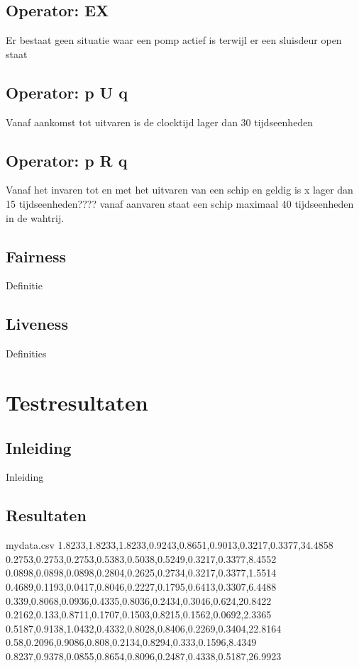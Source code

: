\documentclass{article}
\begin{document}
	\subsection{Operator: EX}
	Er bestaat geen situatie waar een pomp actief is terwijl er een sluisdeur open staat
	\subsection{Operator: p U q}
	Vanaf aankomst tot uitvaren is de clocktijd lager dan 30 tijdseenheden 
	\subsection{Operator: p R q}
	Vanaf het invaren tot en met het uitvaren van een schip en geldig is x lager dan 15 tijdseenheden????
	vanaf aanvaren staat een schip maximaal 40 tijdseenheden in de wahtrij.
	\subsection{Fairness}
	
	Definitie
	
	\subsection{Liveness}
	
	
	Definities
	
	\newpage
	\section{Testresultaten}
	
	\subsection{Inleiding}
	Inleiding
	
	\subsection{Resultaten}
	 \begin{filecontents*}{mydata.csv}
		1.8233,1.8233,1.8233,0.9243,0.8651,0.9013,0.3217,0.3377,34.4858
		0.2753,0.2753,0.2753,0.5383,0.5038,0.5249,0.3217,0.3377,8.4552
		0.0898,0.0898,0.0898,0.2804,0.2625,0.2734,0.3217,0.3377,1.5514
		0.4689,0.1193,0.0417,0.8046,0.2227,0.1795,0.6413,0.3307,6.4488
		0.339,0.8068,0.0936,0.4335,0.8036,0.2434,0.3046,0.624,20.8422
		0.2162,0.133,0.8711,0.1707,0.1503,0.8215,0.1562,0.0692,2.3365
		0.5187,0.9138,1.0432,0.4332,0.8028,0.8406,0.2269,0.3404,22.8164
		0.58,0.2096,0.9086,0.808,0.2134,0.8294,0.333,0.1596,8.4349
		0.8237,0.9378,0.0855,0.8654,0.8096,0.2487,0.4338,0.5187,26.9923 
	\end{filecontents*}
\end{document}
